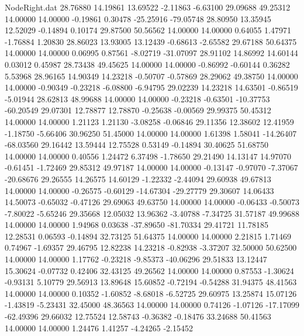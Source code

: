 \begin{filecontents}{NodeRight.dat}
  28.76880   14.19861   13.69522    -2.11863   -6.63100   29.09688   49.25312   14.00000   14.00000   -0.19861    0.30478  -25.25916  -79.05748
  28.80950   13.35945   12.52029    -0.14894    0.10174   29.87500   50.56562   14.00000   14.00000    0.64055    1.47971   -1.76884    1.20830
  28.86023   13.93005   13.12439    -0.68613   -2.65582   29.67188   50.64375   14.00000   14.00000    0.06995    0.87561   -8.02719  -31.07097
  28.91102   14.86992   14.60144     0.03012    0.45987   28.73438   49.45625   14.00000   14.00000   -0.86992   -0.60144    0.36282    5.53968
  28.96165   14.90349   14.23218    -0.50707   -0.57869   28.29062   49.38750   14.00000   14.00000   -0.90349   -0.23218   -6.08800   -6.94795
  29.02239   14.23218   14.63501    -0.86519   -5.01944   28.62813   48.99688   14.00000   14.00000   -0.23218   -0.63501  -10.37753  -60.20549
  29.07301   12.78877   12.78870    -0.25638   -0.00569   29.99375   50.45312   14.00000   14.00000    1.21123    1.21130   -3.08258   -0.06846
  29.11356   12.38602   12.41959    -1.18750   -5.66406   30.96250   51.45000   14.00000   14.00000    1.61398    1.58041  -14.26407  -68.03560
  29.16442   13.59444   12.75528     0.53149   -0.14894   30.40625   51.68750   14.00000   14.00000    0.40556    1.24472    6.37498   -1.78650
  29.21490   14.13147   14.97070    -0.61451   -1.72469   29.85312   49.97187   14.00000   14.00000   -0.13147   -0.97070   -7.37067  -20.68676
  29.26555   14.26575   14.60129    -1.22332   -2.44094   29.60938   49.67813   14.00000   14.00000   -0.26575   -0.60129  -14.67304  -29.27779
  29.30607   14.06433   14.50073    -0.65032   -0.47126   29.69063   49.63750   14.00000   14.00000   -0.06433   -0.50073   -7.80022   -5.65246
  29.35668   12.05032   13.96362    -3.40788   -7.34725   31.57187   49.99688   14.00000   14.00000    1.94968    0.03638  -37.89650  -81.70334
  29.41721   11.78185   12.28531     0.06593   -0.14894   32.73125   51.64375   14.00000   14.00000    2.21815    1.71469    0.74967   -1.69357
  29.46795   12.82238   14.23218    -0.82938   -3.37207   32.50000   50.62500   14.00000   14.00000    1.17762   -0.23218   -9.85373  -40.06296
  29.51833   13.12447   15.30624    -0.07732    0.42406   32.43125   49.26562   14.00000   14.00000    0.87553   -1.30624   -0.93131    5.10779
  29.56913   13.89648   15.60852    -0.72194   -0.54288   31.94375   48.41563   14.00000   14.00000    0.10352   -1.60852   -8.68018   -6.52725
  29.60975   13.25874   15.07126    -1.43819   -5.23431   32.45000   48.36563   14.00000   14.00000    0.74126   -1.07126  -17.17099  -62.49396
  29.66032   12.75524   12.58743    -0.36382   -0.18476   33.24688   50.41563   14.00000   14.00000    1.24476    1.41257   -4.24265   -2.15452

\end{filecontents}
